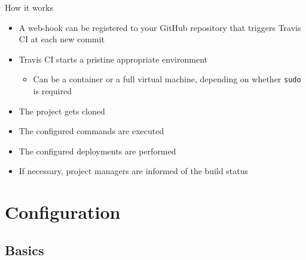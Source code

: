 \documentclass[presentation]{beamer}
\begin{document}
\begin{frame}[fragile]{How it works}
	\begin{itemize}
		\item A web-hook can be registered to your GitHub repository that triggers Travis CI at each new commit
		\item Travis CI starts a pristine appropriate environment
		\begin{itemize}
			\item Can be a container or a full virtual machine, depending on whether \texttt{sudo} is required \cite{travisbuild}
		\end{itemize}
		\item The project gets cloned
		\item The configured commands are executed
		\item The configured deployments are performed
		\item If necessary, project managers are informed of the build status
	\end{itemize}
\end{frame}

\section{Configuration}

\subsection{Basics}
\end{document}
